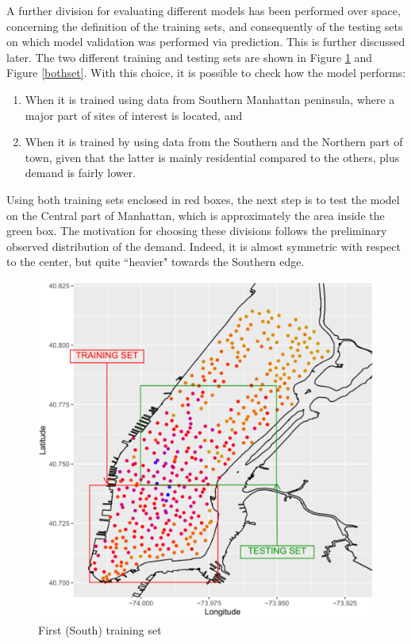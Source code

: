 \documentclass[12pt]{article}
\begin{document}
\noindent
A further division for evaluating different models has been performed over space, concerning the definition of the training sets, and consequently of the testing sets on which model validation was performed via prediction. This is further discussed later. The two different training and testing sets are shown in Figure \ref{southset} and Figure \ref{bothset}. With this choice, it is possible to check how the model performs:
	\begin{enumerate}[label=(\arabic*)]
		\item  When it is trained using data from Southern Manhattan peninsula, where a major part of sites of interest is located, and 
		\item  When it is trained by using data from the Southern and the Northern part of town, given that the latter is mainly residential compared to the others, plus demand is fairly lower.
	\end{enumerate}
	Using both training sets enclosed in red boxes, the next step is to test the model on the Central part of Manhattan, which is approximately the area inside the green box.
	The motivation for choosing these divisions follows the preliminary observed distribution of the demand. Indeed, it is almost symmetric with respect to the center, but quite ``heavier" towards the Southern edge.
	\vspace{3 mm}
	\begin{figure}[H]
		\centering
		\includegraphics[scale=0.5]{Pictures/manhattan_map_test1.pdf}
		\caption{First (South) training set}\label{southset}
	\end{figure}
\end{document}
